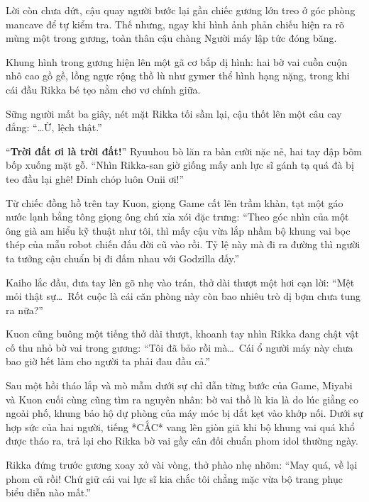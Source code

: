 \documentclass[../main.tex]{subfiles}
\begin{document}
Lời còn chưa dứt, cậu quay người bước lại gần chiếc gương lớn treo ở góc phòng mancave để tự kiểm tra. Thế nhưng, ngay khi hình ảnh phản chiếu hiện ra rõ mùng một trong gương, toàn thân cậu chàng Người máy lập tức đóng băng.

Khung hình trong gương hiện lên một gã cơ bắp dị hình: hai bờ vai cuồn cuộn nhô cao gồ gề, lồng ngực rộng thồ lù như gymer thể hình hạng nặng, trong khi cái đầu Rikka bé tẹo nằm chơ vơ chính giữa.


Sững người mất ba giây, nét mặt Rikka tối sầm lại, cậu thốt lên một câu cay đắng: ``\dots Ừ, lệch thật.''

``\textbf{Trời đất ơi là trời đất!}'' Ryuuhou bò lăn ra bàn cười nặc nẻ, hai tay đập bôm bốp xuống mặt gỗ. ``Nhìn Rikka-san giờ giống mấy anh lực sĩ gánh tạ quá đà bị teo đầu lại ghê! Đỉnh chóp luôn Onii ơi!''

Từ chiếc đồng hồ trên tay Kuon, giọng Game cất lên trầm khàn, tạt một gáo nước lạnh bằng tông giọng ông chú xỉa xói đặc trưng: ``Theo góc nhìn của một ông già am hiểu kỹ thuật như tôi, thì mấy cậu vừa lắp nhầm bộ khung vai bọc thép của mẫu robot chiến đấu đời cũ vào rồi. Tỷ lệ này mà đi ra đường thì người ta tưởng cậu chuẩn bị đi đấm nhau với Godzilla đấy.''

Kaiho lắc đầu, đưa tay lên gõ nhẹ vào trán, thở dài thượt một hơi cạn lời: ``Mệt mỏi thật sự\dots\ Rốt cuộc là cái căn phòng này còn bao nhiêu trò dị bợm chưa tung ra nữa?''

Kuon cũng buông một tiếng thở dài thượt, khoanh tay nhìn Rikka đang chật vật cố thu nhỏ bờ vai trong gương: ``Tôi đã bảo rồi mà\dots\ Cái ổ người máy này chưa bao giờ hết làm cho người ta phải đau đầu cả.''

\omk

Sau một hồi tháo lắp và mò mẫm dưới sự chỉ dẫn từng bước của Game, Miyabi và Kuon cuối cùng cũng tìm ra nguyên nhân: bờ vai thồ lù kia là do lúc giằng co ngoài phố, khung bảo hộ dự phòng của máy móc bị dắt kẹt vào khớp nối. Dưới sự hợp sức của hai người, tiếng *CẮC* vang lên giòn giã khi bộ khung vai quá khổ được tháo ra, trả lại cho Rikka bờ vai gầy cân đối chuẩn phom idol thường ngày.

Rikka đứng trước gương xoay xở vài vòng, thở phào nhẹ nhõm: ``May quá, về lại phom cũ rồi! Chứ giữ cái vai lực sĩ kia chắc tôi chẳng mặc vừa bộ trang phục biểu diễn nào mất.''
\end{document}
